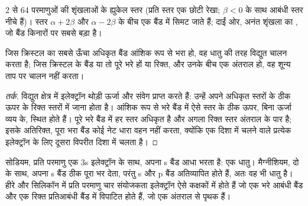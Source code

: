 \begin{omfigure}

{\small 2 से 64 परमाणुओं की शृंखलाओं के ह्युकेल स्तर (प्रति स्तर एक छोटी रेखा;
$\beta < 0$ के साथ आबंधी स्तर नीचे हैं)। स्तर
$\alpha + 2\beta$ और $\alpha - 2\beta$ के बीच एक बैंड में सिमट जाते हैं; दाईं ओर, अनंत
शृंखला का , जो बैंड किनारों पर सबसे बड़ा है।}
\end{omfigure}

\begin{proposition}[बैंड का भराव]\label{prop:b3:solid-state:filling}
जिस क्रिस्टल का सबसे ऊँचा अधिकृत बैंड आंशिक रूप से भरा हो, वह धातु की तरह
विद्युत चालन करता है; जिस क्रिस्टल के बैंड या तो पूरे भरे हों या रिक्त, और उनके बीच
एक अंतराल हो, वह शून्य ताप पर चालन नहीं करता।
\end{proposition}

\begin{proof}[तर्क]
विद्युत क्षेत्र में इलेक्ट्रॉन थोड़ी ऊर्जा और संवेग प्राप्त करते हैं: उन्हें
अपने अधिकृत स्तरों के ठीक ऊपर के रिक्त स्तरों में जाना होता है। आंशिक रूप से भरे
बैंड में ऐसे स्तर  के ठीक ऊपर, बिना ऊर्जा व्यय के, स्थित होते हैं।
पूरे भरे बैंड में हर स्तर अधिकृत है और अगला रिक्त स्तर अंतराल के पार है;
इसके अतिरिक्त, पूरा भरा बैंड कोई नेट धारा वहन नहीं करता, क्योंकि एक दिशा में चलने वाले
प्रत्येक इलेक्ट्रॉन के लिए दूसरा विपरीत दिशा में चलता है।
\end{proof}

सोडियम, प्रति परमाणु एक 3s इलेक्ट्रॉन के साथ, अपना s बैंड आधा भरता है: एक धातु।
मैग्नीशियम, दो के साथ, अपना s बैंड ठीक पूरा भर देता, परंतु s और p बैंड
अतिव्यापित होते हैं, अतः वह भी धातु है। हीरे और सिलिकॉन में प्रति परमाणु चार संयोजकता
इलेक्ट्रॉन ऐसे कक्षकों में होते हैं जो एक भरे आबंधी बैंड और एक रिक्त
प्रतिआबंधी बैंड में विपाटित होते हैं, जो एक अंतराल से पृथक हैं।

